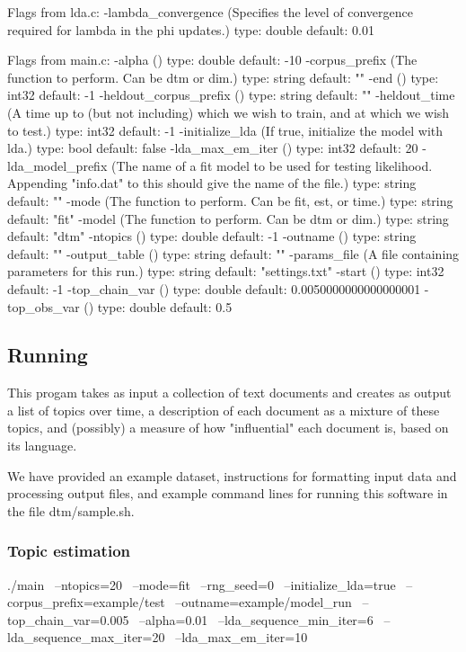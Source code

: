   Flags from lda.c:
    -lambda_convergence (Specifies the level of convergence required for lambda
      in the phi updates.) type: double default: 0.01

  Flags from main.c:
    -alpha () type: double default: -10
    -corpus_prefix (The function to perform. Can be dtm or dim.) type: string
      default: ""
    -end () type: int32 default: -1
    -heldout_corpus_prefix () type: string default: ""
    -heldout_time (A time up to (but not including) which we wish to train, and
      at which we wish to test.) type: int32 default: -1
    -initialize_lda (If true, initialize the model with lda.) type: bool
      default: false
    -lda_max_em_iter () type: int32 default: 20
    -lda_model_prefix (The name of a fit model to be used for testing
      likelihood.  Appending "info.dat" to this should give the name of the
      file.) type: string default: ""
    -mode (The function to perform. Can be fit, est, or time.) type: string
      default: "fit"
    -model (The function to perform. Can be dtm or dim.) type: string
      default: "dtm"
    -ntopics () type: double default: -1
    -outname () type: string default: ""
    -output_table () type: string default: ""
    -params_file (A file containing parameters for this run.) type: string
      default: "settings.txt"
    -start () type: int32 default: -1
    -top_chain_var () type: double default: 0.0050000000000000001
    -top_obs_var () type: double default: 0.5





\subsection{Running}

This progam takes as input a collection of text documents and creates
as output a list of topics over time, a description of each document
as a mixture of these topics, and (possibly) a measure of how
"influential" each document is, based on its language.

We have provided an example dataset, instructions for formatting input
data and processing output files, and example command lines for
running this software in the file dtm/sample.sh.


\subsubsection{Topic estimation}

./main \
  --ntopics=20 \
  --mode=fit \
  --rng_seed=0 \
  --initialize_lda=true \
  --corpus_prefix=example/test \
  --outname=example/model_run \
  --top_chain_var=0.005 \
  --alpha=0.01 \
  --lda_sequence_min_iter=6 \
  --lda_sequence_max_iter=20 \
  --lda_max_em_iter=10


